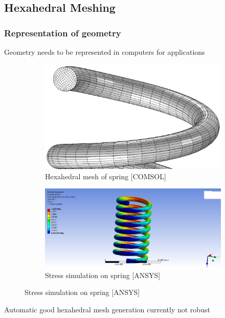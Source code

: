 \documentclass[
	11pt, %
	aspectratio=169, %
]{beamer}
\begin{document}

\subsection{Hexahedral Meshing}

\begin{frame}
	\frametitle{Representation of geometry}
    Geometry needs to be represented in computers for applications
    
    \begin{figure}
        \begin{subfigure}{0.45\textwidth}
            \centering
            \includegraphics[width=\linewidth]{spiral.png}
            \caption{Hexahedral mesh of spring [COMSOL]}
            \label{fig:sub1}
        \end{subfigure}%
        \begin{subfigure}{0.45\textwidth}
            \centering
            \includegraphics[width=\linewidth]{spring.png}
            \caption{Stress simulation on spring [ANSYS]}
            \label{fig:sub2}
        \end{subfigure}%
	\end{figure}
    Automatic good hexahedral mesh generation currently not robust
\end{frame}
\end{document}

